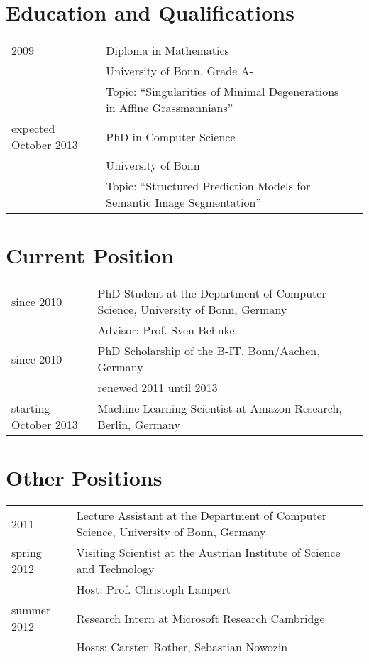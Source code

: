\documentclass[a4paper,11pt]{article}
\begin{document}
\maketitle

\section{Education and Qualifications}
\begin{tabular}{lll}
    2009 & Diploma in Mathematics \\ & University of Bonn, Grade A-\\
         & Topic: ``Singularities of Minimal Degenerations in Affine Grassmannians'' \\
    expected October 2013 & PhD in Computer Science \\ & University of Bonn \\
         & Topic: ``Structured Prediction Models for Semantic Image Segmentation''
\end{tabular}

\section{Current Position}
\begin{tabular}{lll}
    since 2010 & PhD Student at the Department of Computer Science, University of Bonn, Germany\\
               & Advisor: Prof. Sven Behnke\\
    since 2010 & PhD Scholarship of the B-IT, Bonn/Aachen, Germany\\
               & renewed 2011 until 2013\\
    starting October 2013& Machine Learning Scientist at Amazon Research, Berlin, Germany
\end{tabular}

\section{Other Positions}
\begin{tabular}{lll}
    2011 & Lecture Assistant at the Department of Computer Science, University of Bonn, Germany \\
    spring 2012 & Visiting Scientist at the Austrian Institute of Science and Technology\\
               & Host: Prof. Christoph Lampert\\
    summer 2012 & Research Intern at Microsoft Research Cambridge\\
               & Hosts: Carsten Rother, Sebastian Nowozin\\
\end{tabular}
\end{document}
